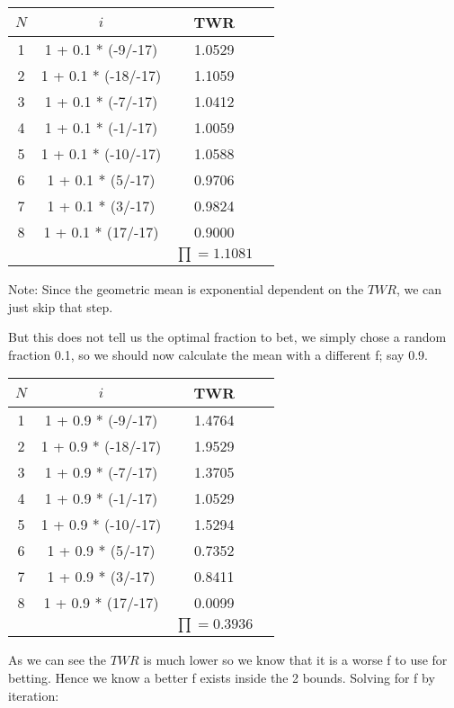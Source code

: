\documentclass[12pt]{article}
\begin{document}
\begin{center}
\begin{tabular}{ |c|c|c|c| } 
 \hline
    \(N\) & \(i\) & TWR \\
    \hline
    1 & 1 + 0.1 * (-9/-17)  & 1.0529 \\
    2 & 1 + 0.1 * (-18/-17) & 1.1059 \\
    3 & 1 + 0.1 * (-7/-17)  & 1.0412 \\
    4 & 1 + 0.1 * (-1/-17)  & 1.0059 \\
    5 & 1 + 0.1 * (-10/-17) & 1.0588 \\
    6 & 1 + 0.1 * (5/-17)   & 0.9706 \\
    7 & 1 + 0.1 * (3/-17)   & 0.9824 \\
    8 & 1 + 0.1 * (17/-17)  & 0.9000 \\
    \hline
    & & \(\prod = 1.1081\)\\
 \hline
\end{tabular}
\end{center}

Note: Since the geometric mean is exponential dependent on the \(TWR\), we can just skip that
step.

But this does not tell us the optimal fraction to bet, we simply chose a random fraction 
0.1, so we should now calculate the mean with a different f; say 0.9.

\begin{center}
\begin{tabular}{ |c|c|c|c| } 
 \hline
    \(N\) & \(i\) & TWR \\
    \hline
    1 & 1 + 0.9 * (-9/-17)  & 1.4764 \\
    2 & 1 + 0.9 * (-18/-17) & 1.9529 \\
    3 & 1 + 0.9 * (-7/-17)  & 1.3705 \\
    4 & 1 + 0.9 * (-1/-17)  & 1.0529 \\
    5 & 1 + 0.9 * (-10/-17) & 1.5294 \\
    6 & 1 + 0.9 * (5/-17)   & 0.7352 \\
    7 & 1 + 0.9 * (3/-17)   & 0.8411 \\
    8 & 1 + 0.9 * (17/-17)  & 0.0099 \\
    \hline
    & & \(\prod = 0.3936\)\\
 \hline
\end{tabular}
\end{center}

As we can see the \(TWR\) is much lower so we know that it is a worse f to use for betting. Hence
we know a better f exists inside the 2 bounds. Solving for f by iteration:
\end{document}
